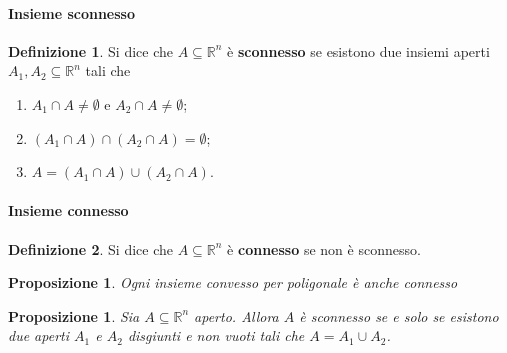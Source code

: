 \documentclass{article}
\theoremstyle{plain}
\newtheorem{prop}[thm]{Proposizione}
\theoremstyle{definition}
\newtheorem{defn}{Definizione}[section]
\theoremstyle{remark}
\begin{document}
\vspace{10pt}

\paragraph{Insieme sconnesso}
\begin{bxthm}
\begin{defn}
    Si dice che $A\subseteq\mathbb{R}^n$ è \textbf{sconnesso} se esistono due insiemi aperti $A_1,A_2\subseteq\mathbb{R}^n$ tali che 
    \begin{enumerate}
        \item $A_1\cap A\neq\emptyset$ e $A_2\cap A\neq\emptyset$;
        \item $(A_1\cap A)\cap(A_2\cap A)=\emptyset$;
        \item $A=(A_1\cap A)\cup(A_2\cap A)$.
    \end{enumerate}
\end{defn}
\end{bxthm}

\vspace{10pt}

\paragraph{Insieme connesso}
\begin{bxthm}
\begin{defn}
    Si dice che $A\subseteq\mathbb{R}^n$ è \textbf{connesso} se non è sconnesso.
\end{defn}
\end{bxthm}

\vspace{10pt}

\begin{bxthm}
\begin{prop}
    Ogni insieme convesso per poligonale è anche connesso
\end{prop}
\end{bxthm}

\vspace{10pt}

\begin{bxthm}
\begin{prop}
   Sia $A\subseteq\mathbb{R}^n$ aperto.
   Allora $A$ è sconnesso se e solo se esistono due aperti $A_1$ e $A_2$ disgiunti e non vuoti tali che $A=A_1\cup A_2$.
\end{prop}
\end{bxthm}
\end{document}
